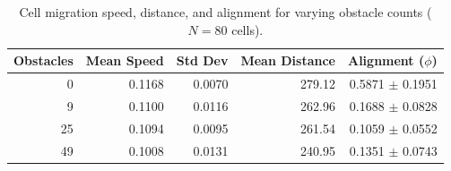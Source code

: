 \begin{table}[h]
\centering
\caption{Cell migration speed, distance, and alignment for varying obstacle counts ($N=80$ cells).}
\label{tab:speedcheck}
\begin{tabular}{r r r r r}
\toprule
Obstacles & Mean Speed & Std Dev & Mean Distance & Alignment ($\phi$) \\
\midrule
0 & 0.1168 & 0.0070 & 279.12 & 0.5871 $\pm$ 0.1951 \\
9 & 0.1100 & 0.0116 & 262.96 & 0.1688 $\pm$ 0.0828 \\
25 & 0.1094 & 0.0095 & 261.54 & 0.1059 $\pm$ 0.0552 \\
49 & 0.1008 & 0.0131 & 240.95 & 0.1351 $\pm$ 0.0743 \\
\bottomrule
\end{tabular}
\end{table}
